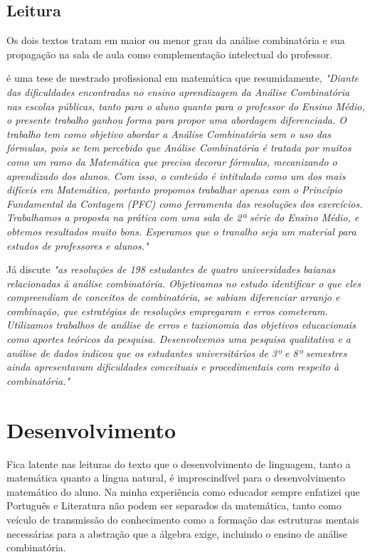 \documentclass[
	12pt,				%
	openright,			%
	oneside,
	a4paper,			%
	chapter=TITLE,		%
	section=TITLE,		%
	sumario=abnt-6027-2012,
	english,			%
	brazil				%
]{abntex2}
\begin{document}
		
	\section{Leitura} 
		Os dois textos tratam em maior ou menor grau da análise combinatória e sua propagação na sala de aula como complementação intelectual do professor.
		
		 é uma tese de mestrado profissional em matemática que resumidamente, \textit{"Diante das dificuldades encontradas no ensino aprendizagem da Análise Combinatória nas escolas públicas, tanto para o aluno quanto para o professor do Ensino Médio, o presente trabalho ganhou forma para propor uma abordagem diferenciada. O trabalho tem como objetivo abordar a Análise Combinatória sem o uso das fórmulas, pois se tem percebido que Análise Combinatória é tratada por muitos como um ramo da Matemática que precisa decorar fórmulas, mecanizando o aprendizado dos alunos. Com isso, o conteúdo é intitulado como um dos mais difíceis em Matemática, portanto propomos trabalhar apenas com o Princípio Fundamental da Contagem (PFC) como ferramenta das resoluções dos exercícios. Trabalhamos a proposta na prática com uma sala de 2ª série do Ensino Médio, e obtemos resultados muito bons. Esperamos que o tranalho seja um material para estudos de professores e alunos."}
		
		Já  discute \textit{"as resoluções de 198 estudantes de quatro universidades baianas relacionadas à análise combinatória. Objetivamos no estudo identificar o que eles compreendiam de conceitos de combinatória, se sabiam diferenciar arranjo e combinação, que estratégias de resoluções empregaram e erros cometeram. Utilizamos trabalhos de análise de erros e taxionomia dos objetivos educacionais como aportes teóricos da pesquisa. Desenvolvemos uma pesquisa qualitativa e a análise de dados indicou que os estudantes universitários de 3º e 8º semestres ainda apresentavam dificuldades conceituais e procedimentais com respeito à combinatória."}


			
\chapter{Desenvolvimento}

	Fica latente nas leituras do texto que o desenvolvimento de linguagem, tanto a matemática quanto a língua natural, é imprescindível para o desenvolvimento matemático do aluno. Na minha experiência como educador sempre enfatizei que Português e Literatura não podem ser separados da matemática, tanto como veículo de transmissão do conhecimento como a formação das estruturas mentais necessárias para a abstração que a álgebra exige, incluindo o ensino de análise combinatória. 
	
\end{document}
